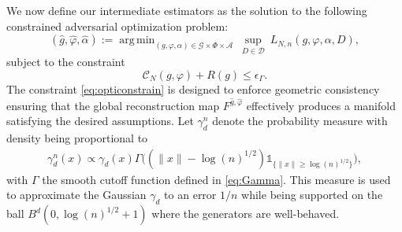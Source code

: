 \documentclass[10pt]{article}
\DeclareMathOperator*{\argmin}{arg\,min}
\begin{document}
We now define our  intermediate estimators as the solution to the following constrained adversarial optimization problem:
\begin{equation}\label{eq:estimator}
    (\hat{g},\hat{\varphi},\hat{\alpha}):= \argmin_{(g,\varphi,\alpha)\in \mathcal{G}\times  \Phi\times  \mathcal{A}}\ \sup_{D\in \mathcal{D}} \ L_{N,n}(g,\varphi,\alpha,D),
\end{equation}
subject to the constraint
\begin{equation}\label{eq:opticonstrain}
\mathcal{C}_N(g, \varphi) + R(g) \leq \epsilon_\Gamma.
\end{equation}
The constraint \eqref{eq:opticonstrain} is designed to enforce geometric consistency  ensuring that the global reconstruction map $F^{\hat{g},\hat{\varphi}}$ effectively produces a manifold satisfying the desired assumptions.
Let $\gamma_d^n$ denote the probability measure with density being proportional to
\begin{align}\label{align:mdofiedgauss}
   \gamma_d^n(x)\propto \gamma_d(x)\Gamma\Big((\|x\|-\log(n)^{1/2})\mathds{1}_{\{\|x\|\geq  \log(n)^{1/2}\}}\Big),
\end{align}
with $\Gamma$ the smooth cutoff function defined in \eqref{eq:Gamma}. This measure is used to approximate the Gaussian $\gamma_d$ to an error $1/n$ while being supported on the ball $B^d(0,\log(n)^{1/2}+1)$  where the generators are well-behaved.
\end{document}
